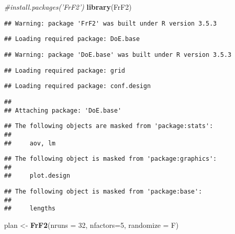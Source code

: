 \documentclass[]{article}
\newenvironment{Shaded}{\begin{snugshade}}{\end{snugshade}}
\newcommand{\KeywordTok}[1]{\textcolor[rgb]{0.13,0.29,0.53}{\textbf{#1}}}
\newcommand{\DataTypeTok}[1]{\textcolor[rgb]{0.13,0.29,0.53}{#1}}
\newcommand{\DecValTok}[1]{\textcolor[rgb]{0.00,0.00,0.81}{#1}}
\newcommand{\StringTok}[1]{\textcolor[rgb]{0.31,0.60,0.02}{#1}}
\newcommand{\CommentTok}[1]{\textcolor[rgb]{0.56,0.35,0.01}{\textit{#1}}}
\newcommand{\NormalTok}[1]{#1}
\begin{document}
\begin{Shaded}
\begin{Highlighting}[]
\CommentTok{#install.packages('FrF2')}
\KeywordTok{library}\NormalTok{(FrF2)}
\end{Highlighting}
\end{Shaded}

\begin{verbatim}
## Warning: package 'FrF2' was built under R version 3.5.3
\end{verbatim}

\begin{verbatim}
## Loading required package: DoE.base
\end{verbatim}

\begin{verbatim}
## Warning: package 'DoE.base' was built under R version 3.5.3
\end{verbatim}

\begin{verbatim}
## Loading required package: grid
\end{verbatim}

\begin{verbatim}
## Loading required package: conf.design
\end{verbatim}

\begin{verbatim}
## 
## Attaching package: 'DoE.base'
\end{verbatim}

\begin{verbatim}
## The following objects are masked from 'package:stats':
## 
##     aov, lm
\end{verbatim}

\begin{verbatim}
## The following object is masked from 'package:graphics':
## 
##     plot.design
\end{verbatim}

\begin{verbatim}
## The following object is masked from 'package:base':
## 
##     lengths
\end{verbatim}

\begin{Shaded}
\begin{Highlighting}[]
\NormalTok{plan <-}\StringTok{ }\KeywordTok{FrF2}\NormalTok{(}\DataTypeTok{nruns =} \DecValTok{32}\NormalTok{, }\DataTypeTok{nfactors=}\DecValTok{5}\NormalTok{, }\DataTypeTok{randomize =}\NormalTok{ F)}
\end{Highlighting}
\end{Shaded}
\end{document}
